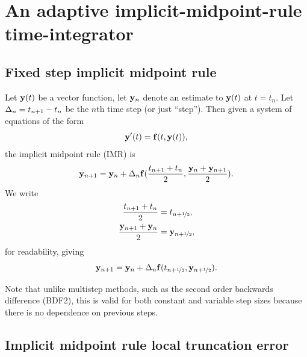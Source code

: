 

\section{An adaptive implicit-midpoint-rule time-integrator}




\subsection{Fixed step implicit midpoint rule}

Let $\mathbf{y}(t)$ be a vector function, let $\mathbf{y}_n$ denote an estimate to $\mathbf{y}(t)$ at $t = t_n$.
Let $\Delta_{n} = t_{n+1} - t_n$ be the $n$th time step (or just ``step'').
Then given a system of equations of the form
\begin{equation}
  \mathbf{y}'(t) = {\mathbf{f}}(t, \mathbf{y}(t)),
  \label{eq:43}
\end{equation}
the implicit midpoint rule (IMR) is
\begin{equation}
    \mathbf{y}_{n+1} = \mathbf{y}_n + \Delta_{n} {\mathbf{f}}(\frac{t_{n+1} + t_n}{2}, \frac{\mathbf{y}_n + \mathbf{y}_{n+1}}{2}).
    \notag
\end{equation}
We write
\begin{equation}
  \begin{aligned}
    \frac{t_{n+1} + t_n}{2} &= t_{n+\nicefrac{1}{2}}, \\
    \frac{\mathbf{y}_{n+1} + \mathbf{y}_n}{2} &= \mathbf{y}_{n+\nicefrac{1}{2}},
  \end{aligned}
\end{equation}
for readability, giving
\begin{equation}
  \mathbf{y}_{n+1} = \mathbf{y}_n + \Delta_{n} {\mathbf{f}}(t_{n+\nicefrac{1}{2}}, \mathbf{y}_{n+\nicefrac{1}{2}}).
  \label{eq:basic-midpoint}
\end{equation}

Note that unlike multistep methods, such as the second order backwards difference (BDF2), this is valid for both constant and variable step sizes because there is no dependence on previous steps.


\subsection{Implicit midpoint rule local truncation error}
\label{sec:deriv-local-trunc}

